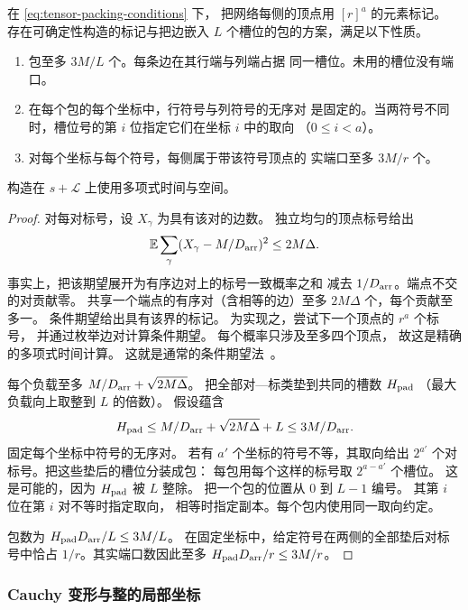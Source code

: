 \begin{lemma}[装箱成包]\label{lem:tensor-packets}
在 \eqref{eq:tensor-packing-conditions} 下，
把网络每侧的顶点用 $[r]^a$ 的元素标记。
存在可确定性构造的标记与把边嵌入 $L$
个槽位的包的方案，满足以下性质。
\begin{enumerate}
\item 包至多 $3M/L$ 个。每条边在其行端与列端占据
      同一槽位。未用的槽位没有端口。
\item 在每个包的每个坐标中，行符号与列符号的无序对
      是固定的。当两符号不同时，槽位号的第 $i$
      位指定它们在坐标 $i$ 中的取向
      （$0\le i<a$）。
\item 对每个坐标与每个符号，每侧属于带该符号顶点的
      实端口至多 $3M/r$ 个。
\end{enumerate}
构造在 $s+\mathcal L$ 上使用多项式时间与空间。
\end{lemma}
\begin{proof}
对每对标号，设 $X_\gamma$ 为具有该对的边数。
独立均匀的顶点标号给出
\[
 \mathbb E\sum_\gamma (X_\gamma-M/D_{\rm arr})^2\le2M\Delta.
\]
事实上，把该期望展开为有序边对上的标号一致概率之和
减去 $1/D_{\rm arr}$。端点不交的对贡献零。
共享一个端点的有序对（含相等的边）至多 $2M\Delta$
个，每个贡献至多一。
条件期望给出具有该界的标记。
为实现之，尝试下一个顶点的 $r^a$ 个标号，
并通过枚举边对计算条件期望。
每个概率只涉及至多四个顶点，
故这是精确的多项式时间计算。
这就是通常的条件期望法~\cite{Raghavan88}。

每个负载至多 $M/D_{\rm arr}+\sqrt{2M\Delta}$。
把全部对—标类垫到共同的槽数 $H_{\rm pad}$
（最大负载向上取整到 $L$ 的倍数）。
假设蕴含
\[
 H_{\rm pad}\le M/D_{\rm arr}+\sqrt{2M\Delta}+L
              \le3M/D_{\rm arr}.
\]
固定每个坐标中符号的无序对。
若有 $a'$ 个坐标的符号不等，其取向给出 $2^{a'}$
个对标号。把这些垫后的槽位分装成包：
每包用每个这样的标号取 $2^{a-a'}$ 个槽位。
这是可能的，因为 $H_{\rm pad}$ 被 $L$ 整除。
把一个包的位置从 $0$ 到 $L-1$ 编号。
其第 $i$ 位在第 $i$ 对不等时指定取向，
相等时指定副本。每个包内使用同一取向约定。

包数为 $H_{\rm pad}D_{\rm arr}/L\le3M/L$。
在固定坐标中，给定符号在两侧的全部垫后对标号中恰占
$1/r$。其实端口数因此至多
$H_{\rm pad}D_{\rm arr}/r\le3M/r$。
\end{proof}

\subsubsection{Cauchy 变形与整的局部坐标}
\label{subsec:tensor-deformation}

